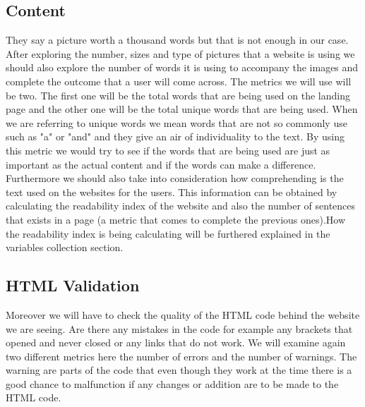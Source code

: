 \documentclass{book}
\begin{document}
\subsection{Content} \label{M:Content}
They say a picture worth a thousand words but that is not enough in our case. After exploring the number, sizes and type of pictures that a website is using we should also explore the number of words it is using to accompany the images and complete the outcome that a user will come across. The metrics we will use will be two. The first one will be the total words that are being used on the landing page and the other one will be the total unique words that are being used. When we are referring to unique words we mean words that are not so commonly use such as "a" or "and" and they give an air of individuality to the text. By using this metric we would try to see if the words that are being used are just as important as the actual content and if the words can make a difference.\\
Furthermore we should also take into consideration how comprehending is the text used on the websites for the users. This information can be obtained by calculating the readability index of the website and also the number of sentences that exists in a page (a metric that comes to complete the previous ones).How the readability index is being calculating will be furthered explained in the variables collection section.
\subsection{HTML Validation} \label{M:HTML Validation} Moreover we will have to check the quality of the HTML code behind the website we are seeing. Are there any mistakes in the code for example any brackets that opened and never closed or any links that do not work. We will examine again two different metrics here the number of errors and the number of warnings. The warning are parts of the code that even though they work at the time there is a good chance to malfunction if any changes or addition are to be made to the HTML code. 
\newpage
\end{document}
